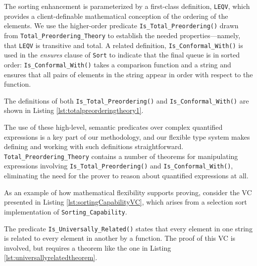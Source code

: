 

The sorting enhancement is parameterized by a first-class definition, \texttt{LEQV}, which provides a client-definable mathematical conception of the ordering of the elements.  We use the higher-order predicate \texttt{Is\_Total\_Preordering()} drawn from \texttt{Total\_Preordering\_Theory} to establish the needed properties---namely, that \texttt{LEQV} is transitive and total.  A related definition, \texttt{Is\_Conformal\_With()} is used in the \emph{ensures} clause of \texttt{Sort} to indicate that the final queue is in sorted order: \texttt{Is\_Conformal\_With()} takes a comparison function and a string and ensures that all pairs of elements in the string appear in order with respect to the function.

The definitions of both \texttt{Is\_Total\_Preordering()} and \texttt{Is\_Conformal\_With()} are shown in Listing \ref{lst:totalpreorderingtheory1}.



The use of these high-level, semantic predicates over complex quantified expressions is a key part of our methodology, and our flexible type system makes defining and working with such definitions straightforward.  \texttt{Total\_Preordering\_Theory} contains a number of theorems for manipulating expressions involving \texttt{Is\_Total\_Preordering()} and \texttt{Is\_Conformal\_With()}, eliminating the need for the prover to reason about quantified expressions at all.  

As an example of how mathematical flexibility supports proving, consider the VC presented in Listing \ref{lst:sortingCapabilityVC}, which arises from a selection sort implementation of \texttt{Sorting\_Capability}.



The predicate \texttt{Is\_Universally\_Related()} states that every element in one string is related to every element in another by a function.  The proof of this VC is involved, but requires a theorem like the one in Listing \ref{lst:universallyrelatedtheorem}.

